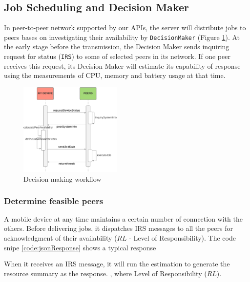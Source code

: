 \documentclass[conference]{IEEEtran}
\begin{document}
\subsection{Job Scheduling and Decision Maker} \label{scheduling}

In peer-to-peer network supported by our APIs, the server will distribute jobs to peers bases on investigating their availability by \texttt{DecisionMaker} (Figure \ref{fig:checkStatus}). At the early stage before the transmission, the Decision Maker sends inquiring request for status (\texttt{IRS}) to some of selected peers in its network. If one peer receives this request, its Decision Maker will estimate its capability of response using the measurements of CPU, memory and battery usage at that time. 

\begin{figure}[H]
\centerline {
\includegraphics[width=0.45\textwidth, natwidth=915, natheight=837]{data/checkStatusFlow}
}
\caption{Decision making workflow}
\label{fig:checkStatus}
\end{figure}

\subsubsection{Determine feasible peers}\label{ss_dfp}

A mobile device at any time maintains a certain number of connection with the others. Before delivering jobs, it dispatches IRS messages to all the peers for acknowledgment of their availability ($RL$ - Level of Responsibility). The code snipe \ref{code:jsonResponse} shows a typical response 

When it receives an IRS message, it will run the estimation to generate the resource summary as the response. , where Level of Responsibility ($RL$).

\noindent {}	
\end{document}
